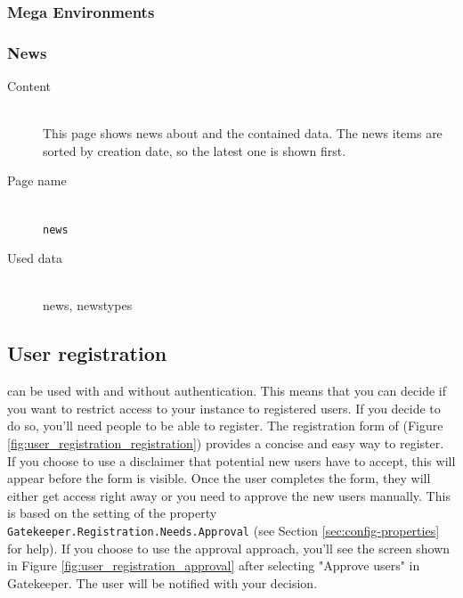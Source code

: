 \subsubsection{Mega Environments}

\subsubsection{News}
\begin{description}
	\item[Content]\hfill\\This page shows news about {\germinate} and the contained data. The news items are sorted by creation date, so the latest one is shown first.
	\item[Page name]\hfill\\\texttt{news}
	\item[Used data]\hfill\\news, newstypes
\end{description}


\subsection{User registration}
\label{sec:registration}

{\germinate} can be used with and without authentication. This means that you can decide if you want to restrict access to your {\germinate} instance to registered users. If you decide to do so, you'll need people to be able to register. The registration form of {\germinate} (Figure \ref{fig:user_registration_registration}) provides a concise and easy way to register. If you choose to use a disclaimer that potential new users have to accept, this will appear before the form is visible. Once the user completes the form, they will either get access right away or you need to approve the new users manually. This is based on the setting of the property \texttt{Gatekeeper.Registration.Needs.Approval} (see Section \ref{sec:config-properties} for help). If you choose to use the approval approach, you'll see the screen shown in Figure \ref{fig:user_registration_approval} after selecting "Approve users" in Gatekeeper. The user will be notified with your decision.

